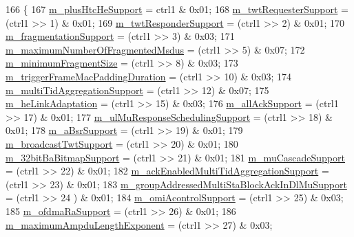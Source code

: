 \begin{DoxyCode}
166 \{
167   \hyperlink{classns3_1_1HeCapabilities_aa6a2ca2426a417f0bc5bc7680ec8b4c1}{m\_plusHtcHeSupport} = ctrl1 & 0x01;
168   \hyperlink{classns3_1_1HeCapabilities_a382c23809a167949cec43da25c8f0608}{m\_twtRequesterSupport} = (ctrl1 >> 1) & 0x01;
169   \hyperlink{classns3_1_1HeCapabilities_a8a734c713abb42b32e4078c761c605a8}{m\_twtResponderSupport} = (ctrl1 >> 2) & 0x01;
170   \hyperlink{classns3_1_1HeCapabilities_a84a70882f86c47a8d78ab0746978eb9f}{m\_fragmentationSupport} = (ctrl1 >> 3) & 0x03;
171   \hyperlink{classns3_1_1HeCapabilities_a05c27329d2e963ea800201b5180ed4c5}{m\_maximumNumberOfFragmentedMsdus} = (ctrl1 >> 5) & 0x07;
172   \hyperlink{classns3_1_1HeCapabilities_a8a64ff2ed1cd3136fd8026c3562c9d9c}{m\_minimumFragmentSize} = (ctrl1 >> 8) & 0x03;
173   \hyperlink{classns3_1_1HeCapabilities_a26cba20100867ce3dc4eff91ca93f326}{m\_triggerFrameMacPaddingDuration} = (ctrl1 >> 10) & 0x03;
174   \hyperlink{classns3_1_1HeCapabilities_a08469c5d5a290f2728c674df38a681a1}{m\_multiTidAggregationSupport} = (ctrl1 >> 12) & 0x07;
175   \hyperlink{classns3_1_1HeCapabilities_ae2b5bc6d8d8b218dbac1efdacc689abb}{m\_heLinkAdaptation} = (ctrl1 >> 15) & 0x03;
176   \hyperlink{classns3_1_1HeCapabilities_a36325eaad1246d1ee77dbdbae43c608c}{m\_allAckSupport} = (ctrl1 >> 17) & 0x01;
177   \hyperlink{classns3_1_1HeCapabilities_abb88eec28bfa8f93ea73c3643485d33d}{m\_ulMuResponseSchedulingSupport} = (ctrl1 >> 18) & 0x01;
178   \hyperlink{classns3_1_1HeCapabilities_aa7a38ebf70a7133df40a734171f542b2}{m\_aBsrSupport} = (ctrl1 >> 19) & 0x01;
179   \hyperlink{classns3_1_1HeCapabilities_a4624bbde1e282a55475c95e392f025cf}{m\_broadcastTwtSupport} = (ctrl1 >> 20) & 0x01;
180   \hyperlink{classns3_1_1HeCapabilities_a7629d4adebd2aaf5af6838ca23718485}{m\_32bitBaBitmapSupport} = (ctrl1 >> 21) & 0x01;
181   \hyperlink{classns3_1_1HeCapabilities_a5a314c610b7489063772e07769ff9562}{m\_muCascadeSupport} = (ctrl1 >> 22) & 0x01;
182   \hyperlink{classns3_1_1HeCapabilities_a483ff6eafe4090c371f997f3b3d00533}{m\_ackEnabledMultiTidAggregationSupport} = (ctrl1 >> 23) & 0x01;
183   \hyperlink{classns3_1_1HeCapabilities_a8ea8d23d3e28711cd82d32cfd2723f7a}{m\_groupAddressedMultiStaBlockAckInDlMuSupport} = (ctrl1 >> 24
      ) & 0x01;
184   \hyperlink{classns3_1_1HeCapabilities_a298a39ff42fc92cdb7eabf4dc93212f1}{m\_omiAcontrolSupport} = (ctrl1 >> 25) & 0x03;
185   \hyperlink{classns3_1_1HeCapabilities_a5ea71c2d79607f3708c739af0c03fde7}{m\_ofdmaRaSupport} = (ctrl1 >> 26) & 0x01;
186   \hyperlink{classns3_1_1HeCapabilities_a720c53d4f149e5b47945c9e9b5882090}{m\_maximumAmpduLengthExponent} = (ctrl1 >> 27) & 0x03;

\end{DoxyCode}
